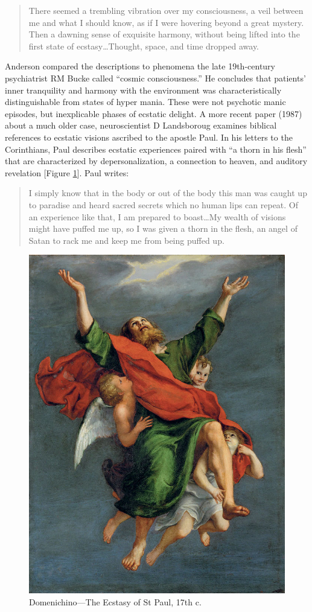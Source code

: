 \documentclass{UIdahoMastersThesis}
\begin{document}
\begin{quote}
{There seemed a trembling vibration over my consciousness, a veil between me and what I should know, as if I were hovering beyond a great mystery. Then a dawning sense of exquisite harmony, without being lifted into the first state of ecstasy\ldots Thought, space, and time dropped away.}
\end{quote}
  
Anderson compared the descriptions to phenomena the late 19th-century psychiatrist RM Bucke called ``cosmic consciousness.'' He concludes that patients' inner tranquility and harmony with the environment was characteristically distinguishable from states of hyper mania. These were not psychotic manic episodes, but inexplicable phases of ecstatic delight.
A more recent paper (1987) about a much older case, neuroscientist D Landsboroug examines biblical references to ecstatic visions ascribed to the apostle Paul. In his letters to the Corinthians, Paul describes ecstatic experiences paired with ``a thorn in his flesh'' that are characterized by depersonalization, a connection to heaven, and auditory revelation [Figure \ref{fig:paul}]. Paul writes:

\begin{quote}
{I simply know that in the body or out of the body this man was caught up to paradise and heard sacred secrets which no human lips can repeat. Of an experience like that, I am prepared to boast\ldots My wealth of visions might have puffed me up, so I was given a thorn in the flesh, an angel of Satan to rack me and keep me from being puffed up.}\cite{bible_new_1984}
\end{quote}

\begin{figure}[h!]
	\centering
	\includegraphics[width=0.63\linewidth]{paul.jpg}
	\caption{Domenichino---The Ecstasy of St Paul, 17th c.}
	\label{fig:paul}
\end{figure}
\end{document}
